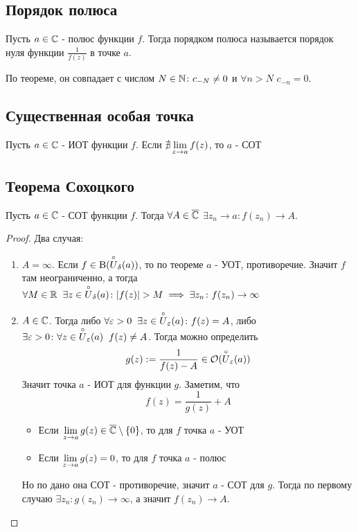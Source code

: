\subsection{Порядок полюса}
\begin{definition}
  Пусть $a\in\mathbb{C}$ - полюс функции $f$. Тогда порядком полюса называется порядок нуля функции $\frac{1}{f(z)}$ в точке $a$.

  По теореме, он совпадает с числом $N\in\mathbb{N}\colon c_{-N}\neq 0$ и $\forall n>N$ $c_{-n}=0$. 
\end{definition}
\subsection{Существенная особая точка}
\begin{definition}
  Пусть $a\in\mathbb{C}$ - ИОТ функции $f$. Если $\nexists\lim\limits_{z \rightarrow a}f(z)$, то $a$ - СОТ
\end{definition}
\subsection{Теорема Сохоцкого}
\begin{theorem}
  Пусть $a\in\mathbb{C}$ - СОТ функции $f$. Тогда $\forall A\in\overline{\mathbb{C}}$ $\exists z_n\to a\colon f(z_n)\to A$. 
\end{theorem}
\begin{proof}
 Два случая:
  \begin{enumerate}
    \item $A=\infty$. Если $f\in {\rm B}(\overset{\circ}{U}_\delta(a))$, то по теореме $a$ - УОТ, противоречие. Значит $f$ там неограниченно, а тогда $\forall M\in\R\q\exists z\in \overset{\circ}{U}_{\delta}(a)\colon |f(z)|>M\implies \exists z_n\colon f(z_n)\to \infty$  
    \item $A\in\mathbb{C}$. Тогда либо $\forall \varepsilon>0\hspace{0.2cm}\exists z\in \overset{\circ}{U}_{\varepsilon}(a)\colon f(z)=A$, либо $\exists \varepsilon>0\colon \forall z\in \overset{\circ}{U}_{\varepsilon}(a)\hspace{0.2cm} f(z)\neq A$. Тогда можно определить
    \[g(z):=\frac{1}{f(z)-A}\in\mathcal{O}(\overset{\circ}{U}_{\varepsilon}(a))\]
    Значит точка $a$ - ИОТ для функции $g$. Заметим, что
    \[f(z) = \frac{1}{g(z)}+A\]
    \begin{itemize}
      \item Если $\lim\limits_{z \rightarrow a}g(z)\in \overline{\mathbb{C}}\setminus \left\{0\right\}$, то для $f$ точка $a$ - УОТ
      \item Если $\lim\limits_{z \rightarrow a}g(z)= 0$, то для $f$ точка $a$ - полюс 
    \end{itemize}
    Но по дано она СОТ - противоречие, значит $a$ - СОТ для $g$. Тогда по первому случаю $\exists z_n\colon g(z_n)\to \infty$, а значит $f(z_n)\to A$. 
  \end{enumerate}
\end{proof}
